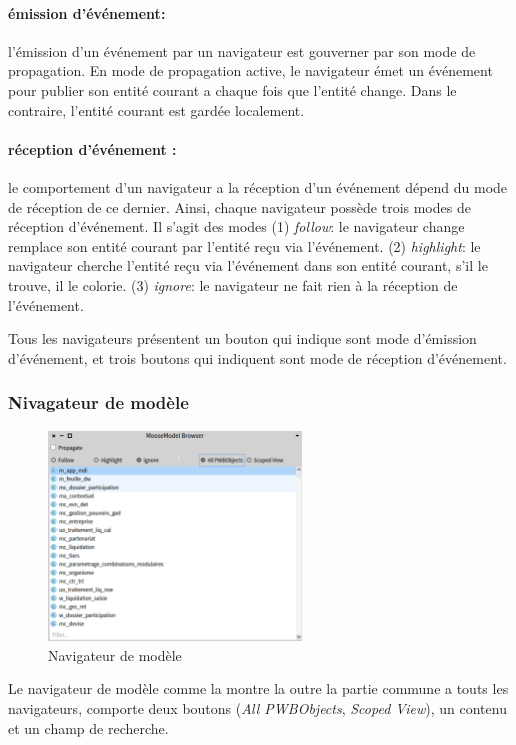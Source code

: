 \documentclass[a4paper]{article}
\begin{document}
\paragraph{émission d'événement:} l'émission d'un événement par un navigateur est gouverner par son mode de propagation.
En mode de propagation active, le navigateur émet un événement pour publier son entité courant a chaque fois que l'entité change.
Dans le contraire, l'entité courant est gardée localement.

\paragraph{réception d'événement : } le comportement d'un navigateur a la réception d'un événement dépend du mode de réception de ce dernier.
Ainsi, chaque navigateur possède trois modes de réception d'événement. 
Il s'agit des modes (1) \textit{follow}: le navigateur change remplace son entité courant par l'entité reçu via l'événement.
(2) \textit{highlight}: le navigateur cherche l'entité reçu via l'événement dans son entité courant, s'il le trouve, il le colorie.
(3) \textit{ignore}: le navigateur ne fait rien à la réception de l'événement.

Tous les navigateurs présentent un bouton qui indique sont mode d'émission d'événement, et trois boutons qui indiquent sont mode de réception d'événement.

\subsubsection{Nivagateur de modèle}
\begin{figure}[htbp]
  \begin{center}
  \includegraphics[width=0.6\textwidth]{./figures/modelBrowser.png}
  \caption{Navigateur de modèle}
  \label{fig:modelBrowser}
\end{center}
\vspace{-0.3cm}
\end{figure}
Le navigateur de modèle comme la montre la  outre la partie commune a touts les navigateurs, comporte deux boutons (\textit{All PWBObjects}, \textit{Scoped View}), un contenu et un champ de recherche.
\end{document}
